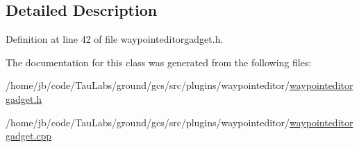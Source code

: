 \subsection{\-Detailed \-Description}


\-Definition at line 42 of file waypointeditorgadget.\-h.



\-The documentation for this class was generated from the following files\-:\begin{DoxyCompactItemize}
\item 
/home/jb/code/\-Tau\-Labs/ground/gcs/src/plugins/waypointeditor/\hyperlink{waypointeditorgadget_8h}{waypointeditorgadget.\-h}\item 
/home/jb/code/\-Tau\-Labs/ground/gcs/src/plugins/waypointeditor/\hyperlink{waypointeditorgadget_8cpp}{waypointeditorgadget.\-cpp}\end{DoxyCompactItemize}
